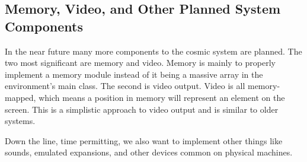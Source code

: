 \documentclass[conference]{IEEEtran}
\begin{document}
\subsection{Memory, Video, and Other Planned System Components}
In the near future many more components to the cosmic system are planned. The two most significant are memory and video. Memory is mainly to properly implement a memory module instead of it being a massive array in the environment's main class. The second is video output. Video is all memory-mapped, which means a position in memory will represent an element on the screen. This is a simplistic approach to video output and is similar to older systems.

Down the line, time permitting, we also want to implement other things like sounds, emulated expansions, and other devices common on physical machines. 
\end{document}

